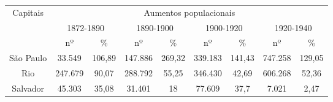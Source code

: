 \begin{table}[!htp]
\centering
{}
{\begin{tabular}{c c c c c c c c c}
\cline{1-9}
\multirow{3}{*}{Capitais} &\multicolumn{8}{c}{Aumentos populacionais}\\
\cline{2-9} & \multicolumn{2}{c}{1872-1890} & \multicolumn{2}{c}{1890-1900} & \multicolumn{2}{c}{1900-1920} & \multicolumn{2}{c}{1920-1940}	\\
\cline{2-9} &nº &\% &nº &\% &nº &\% &nº &\%\\
\hline\hline São Paulo &33.549 &106,89 &147.886 &269,32 &339.183 &141,43 &747.258 &129,05\\
Rio &247.679 &90,07 &288.792 &55,25 &346.430 &42,69 &606.268 &52,36\\
Salvador &45.303 &35,08 &31.401 &18 &77.609 &37,7 &7.021 &2,47\\
\hline
\end{tabular} }
{  }
\end{table}